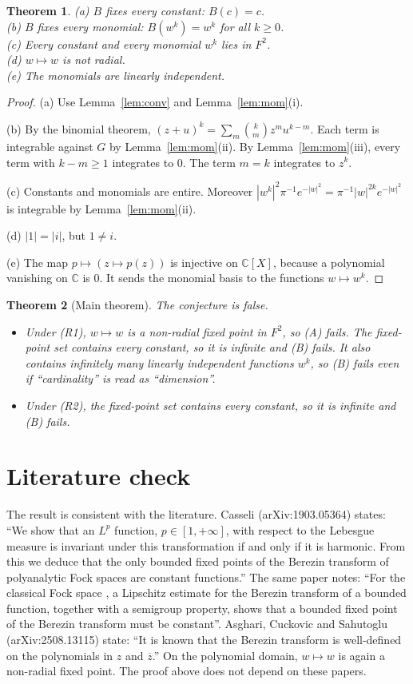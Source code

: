 \documentclass[11pt]{article}
\renewcommand{\_}{\oldus\allowbreak}
\newtheorem{theorem}{Theorem}
\theoremstyle{definition}
\theoremstyle{remark}
\newcommand{\C}{\mathbb{C}}
\begin{document}
\begin{theorem}\label{thm:fixed}
(a) $B$ fixes every constant: $B(c)=c$.\\
(b) $B$ fixes every monomial: $B(w^k)=w^k$ for all $k\ge0$.\\
(c) Every constant and every monomial $w^k$ lies in $F^2$.\\
(d) $w\mapsto w$ is not radial.\\
(e) The monomials are linearly independent.
\end{theorem}
\begin{proof}
(a) Use Lemma~\ref{lem:conv} and Lemma~\ref{lem:mom}(i).

(b) By the binomial theorem, $(z+u)^k=\sum_m\binom km z^m u^{k-m}$. Each term is integrable against $G$
by Lemma~\ref{lem:mom}(ii). By Lemma~\ref{lem:mom}(iii), every term with $k-m\ge1$ integrates to $0$.
The term $m=k$ integrates to $z^k$.

(c) Constants and monomials are entire. Moreover $|w^k|^2\pi^{-1}e^{-|w|^2}=\pi^{-1}|w|^{2k}e^{-|w|^2}$ is
integrable by Lemma~\ref{lem:mom}(ii).

(d) $|1|=|i|$, but $1\ne i$.

(e) The map $p\mapsto(z\mapsto p(z))$ is injective on $\C[X]$, because a polynomial vanishing on $\C$ is
$0$. It sends the monomial basis to the functions $w\mapsto w^k$.
\end{proof}

\begin{theorem}[Main theorem]
The conjecture is false.
\begin{itemize}
\item Under (R1), $w\mapsto w$ is a non-radial fixed point in $F^2$, so (A) fails. The fixed-point set
contains every constant, so it is infinite and (B) fails. It also contains infinitely many linearly
independent functions $w^k$, so (B) fails even if ``cardinality'' is read as ``dimension''.
\item Under (R2), the fixed-point set contains every constant, so it is infinite and (B) fails.
\end{itemize}
\end{theorem}

\section{Literature check}\label{sec:lit}
The result is consistent with the literature. Casseli (arXiv:1903.05364) states: ``We show that an
$L^p$ function, $p\in[1,+\infty]$, with respect to the Lebesgue measure is
invariant under this transformation if and only if it is harmonic. From this we deduce that the only
bounded fixed points of the Berezin transform of polyanalytic Fock spaces are constant functions.'' The
same paper notes: ``For the classical Fock space , a Lipschitz estimate for the Berezin transform of a
bounded function, together with a semigroup property, shows that a bounded fixed point of the Berezin
transform must be constant''. Asghari, Cuckovic and Sahutoglu (arXiv:2508.13115) state: ``It is known
that the Berezin transform is well-defined on the polynomials in $z$ and $\overline{z}$.'' On the polynomial domain, $w\mapsto w$ is again a non-radial fixed point. The proof
above does not depend on these papers.
\end{document}
